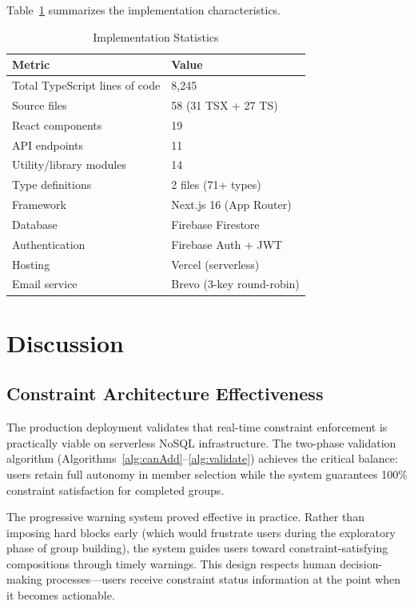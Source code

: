\documentclass[11pt,a4paper]{article}
\theoremstyle{plain}
\theoremstyle{definition}
\begin{document}
Table~\ref{tab:metrics} summarizes the implementation characteristics.

\begin{table}[htbp]
\centering
\caption{Implementation Statistics}
\label{tab:metrics}
\small
\renewcommand{\arraystretch}{1.15}
\begin{tabular}{@{}ll@{}}
\toprule
\textbf{Metric} & \textbf{Value} \\
\midrule
Total TypeScript lines of code & 8,245 \\
Source files & 58 (31 TSX + 27 TS) \\
React components & 19 \\
API endpoints & 11 \\
Utility/library modules & 14 \\
Type definitions & 2 files (71+ types) \\
Framework & Next.js 16 (App Router) \\
Database & Firebase Firestore \\
Authentication & Firebase Auth + JWT \\
Hosting & Vercel (serverless) \\
Email service & Brevo (3-key round-robin) \\
\bottomrule
\end{tabular}
\end{table}

\section{Discussion}
\label{sec:discussion}

\subsection{Constraint Architecture Effectiveness}

The production deployment validates that real-time constraint enforcement is practically viable on serverless NoSQL infrastructure. The two-phase validation algorithm (Algorithms~\ref{alg:canAdd}--\ref{alg:validate}) achieves the critical balance: users retain full autonomy in member selection while the system guarantees 100\% constraint satisfaction for completed groups.

The progressive warning system proved effective in practice. Rather than imposing hard blocks early (which would frustrate users during the exploratory phase of group building), the system guides users toward constraint-satisfying compositions through timely warnings. This design respects human decision-making processes---users receive constraint status information at the point when it becomes actionable.
\end{document}
